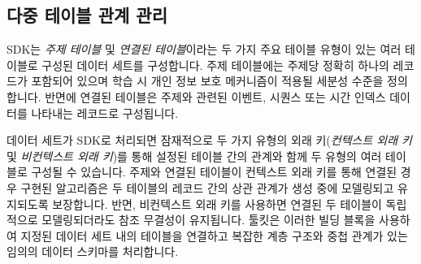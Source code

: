 




\subsection{다중 테이블 관계 관리}

SDK는 \emph{주제 테이블} 및 \emph{연결된 테이블}이라는 두 가지 주요 테이블 유형이 있는 여러 테이블로 구성된 데이터 세트를 구성합니다.
주제 테이블에는 주제당 정확히 하나의 레코드가 포함되어 있으며 학습 시 개인 정보 보호 메커니즘이 적용될 세분성 수준을 정의합니다.
반면에 연결된 테이블은 주제와 관련된 이벤트, 시퀀스 또는 시간 인덱스 데이터를 나타내는 레코드로 구성됩니다.

데이터 세트가 SDK로 처리되면 잠재적으로 두 가지 유형의 외래 키(\emph{컨텍스트 외래 키} 및 \emph{비컨텍스트 외래 키})를 통해 설정된 테이블 간의 관계와 함께 두 유형의 여러 테이블로 구성될 수 있습니다.
주제와 연결된 테이블이 컨텍스트 외래 키를 통해 연결된 경우 구현된 알고리즘은 두 테이블의 레코드 간의 상관 관계가 생성 중에 모델링되고 유지되도록 보장합니다.
반면, 비컨텍스트 외래 키를 사용하면 연결된 두 테이블이 독립적으로 모델링되더라도 참조 무결성이 유지됩니다.
툴킷은 이러한 빌딩 블록을 사용하여 지정된 데이터 세트 내의 테이블을 연결하고 복잡한 계층 구조와 중첩 관계가 있는 임의의 데이터 스키마를 처리합니다.


